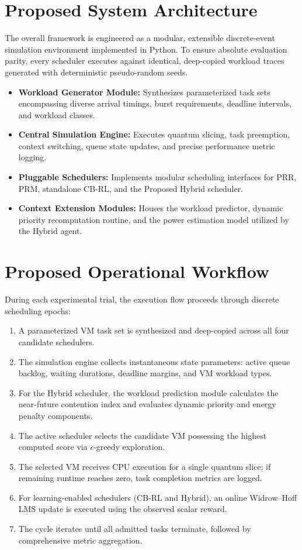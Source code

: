 \documentclass[conference]{IEEEtran}
\begin{document}
\section{Proposed System Architecture}
The overall framework is engineered as a modular, extensible discrete-event simulation environment implemented in Python. To ensure absolute evaluation parity, every scheduler executes against identical, deep-copied workload traces generated with deterministic pseudo-random seeds.
\begin{itemize}
    \item \textbf{Workload Generator Module:} Synthesizes parameterized task sets encompassing diverse arrival timings, burst requirements, deadline intervals, and workload classes.
    \item \textbf{Central Simulation Engine:} Executes quantum slicing, task preemption, context switching, queue state updates, and precise performance metric logging.
    \item \textbf{Pluggable Schedulers:} Implements modular scheduling interfaces for PRR, PRM, standalone CB-RL, and the Proposed Hybrid scheduler.
    \item \textbf{Context Extension Modules:} Houses the workload predictor, dynamic priority recomputation routine, and the power estimation model utilized by the Hybrid agent.
\end{itemize}

\section{Proposed Operational Workflow}
During each experimental trial, the execution flow proceeds through discrete scheduling epochs:
\begin{enumerate}
    \item A parameterized VM task set is synthesized and deep-copied across all four candidate schedulers.
    \item The simulation engine collects instantaneous state parameters: active queue backlog, waiting durations, deadline margins, and VM workload types.
    \item For the Hybrid scheduler, the workload prediction module calculates the near-future contention index and evaluates dynamic priority and energy penalty components.
    \item The active scheduler selects the candidate VM possessing the highest computed score via $\epsilon$-greedy exploration.
    \item The selected VM receives CPU execution for a single quantum slice; if remaining runtime reaches zero, task completion metrics are logged.
    \item For learning-enabled schedulers (CB-RL and Hybrid), an online Widrow--Hoff LMS update is executed using the observed scalar reward.
    \item The cycle iterates until all admitted tasks terminate, followed by comprehensive metric aggregation.
\end{enumerate}
\end{document}
